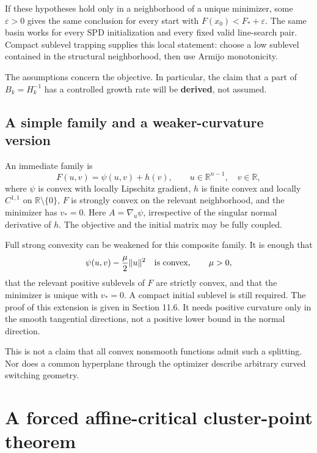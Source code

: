 If these hypotheses hold only in a neighborhood of a unique minimizer,
some \(\varepsilon>0\) gives the same conclusion for every start with
\(F(x_0)<F_*+\varepsilon\). The same basin works for every SPD
initialization and every fixed valid line-search pair. Compact sublevel
trapping supplies this local statement: choose a low sublevel contained
in the structural neighborhood, then use Armijo monotonicity.

The assumptions concern the objective. In particular, the claim that a
part of \(B_k=H_k^{-1}\) has a controlled growth rate will be
\textbf{derived}, not assumed.



\subsection{A simple family and a weaker-curvature
version}\label{U:a-simple-family-and-a-weaker-curvature-version}

An immediate family is \[
 \boxed{F(u,v)=\psi(u,v)+h(v),\qquad u\in\mathbb R^{n-1},\quad v\in\mathbb R,}
\] where \(\psi\) is convex with locally Lipschitz gradient, \(h\) is
finite convex and locally \(C^{1,1}\) on \(\mathbb R\setminus\{0\}\),
\(F\) is strongly convex on the relevant neighborhood, and the minimizer
has \(v_*=0\). Here \(A=\nabla_u\psi\), irrespective of the singular
normal derivative of \(h\). The objective and the initial matrix may be
fully coupled.

Full strong convexity can be weakened for this composite family. It is
enough that \[
 \psi(u,v)-\frac{\mu}{2}\|u\|^2\quad\hbox{is convex},\qquad \mu>0,
\] that the relevant positive sublevels of \(F\) are strictly convex,
and that the minimizer is unique with \(v_*=0\). A compact initial
sublevel is still required. The proof of this extension is given in
Section 11.6. It needs positive curvature only in the smooth tangential
directions, not a positive lower bound in the normal direction.

This is not a claim that all convex nonsmooth functions admit such a
splitting. Nor does a common hyperplane through the optimizer describe
arbitrary curved switching geometry.


\setcounter{section}{1}
\setcounter{theorem}{0}
\setcounter{lemma}{0}
\setcounter{corollary}{0}
\setcounter{proposition}{0}
\setcounter{remark}{0}
\setcounter{equation}{0}


\section{A forced affine-critical cluster-point
theorem}\label{U:a-forced-affine-critical-cluster-point-theorem}

